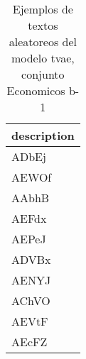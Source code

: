 \begin{table}[H]
\centering
\fontsize{8}{14}\selectfont
\caption{Ejemplos de textos aleatoreos del modelo tvae, conjunto Economicos b-1}
\label{table-sample10-economicos-b-1-tvae-text}
\begin{tabular}{|m{50em}|}
\hline
\rowcolor[gray]{0.8}
description \\
\hline ADbEj \\
\hline AEWOf \\
\hline AAbhB \\
\hline AEFdx \\
\hline AEPeJ \\
\hline ADVBx \\
\hline AENYJ \\
\hline AChVO \\
\hline AEVtF \\
\hline AEcFZ \\
\hline
\end{tabular}
\end{table}
